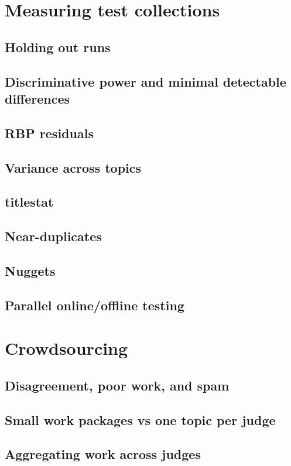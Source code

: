 \documentclass[nobib]{tufte-book}
\begin{document}
\chapter{Measuring test collections} \label{measuring-test-colls}

\section{Holding out runs}
\section{Discriminative power and minimal detectable differences}
\section{RBP residuals}
\section{Variance across topics}
\section{titlestat}
\section{Near-duplicates}
\section{Nuggets}
\section{Parallel online/offline testing}

\chapter{Crowdsourcing}

\section{Disagreement, poor work, and spam}
\section{Small work packages vs one topic per judge}
\section{Aggregating work across judges}
\end{document}
